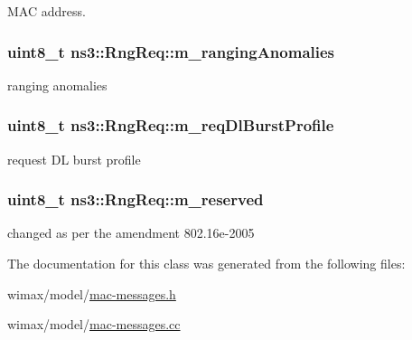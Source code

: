 M\+AC address. 

\subsubsection[{\texorpdfstring{m\+\_\+ranging\+Anomalies}{m_rangingAnomalies}}]{\setlength{\rightskip}{0pt plus 5cm}uint8\+\_\+t ns3\+::\+Rng\+Req\+::m\+\_\+ranging\+Anomalies\hspace{0.3cm}{\ttfamily [private]}}\hypertarget{classns3_1_1RngReq_a08c2d45b0e438f7865807e046087e082}{}\label{classns3_1_1RngReq_a08c2d45b0e438f7865807e046087e082}


ranging anomalies 

\subsubsection[{\texorpdfstring{m\+\_\+req\+Dl\+Burst\+Profile}{m_reqDlBurstProfile}}]{\setlength{\rightskip}{0pt plus 5cm}uint8\+\_\+t ns3\+::\+Rng\+Req\+::m\+\_\+req\+Dl\+Burst\+Profile\hspace{0.3cm}{\ttfamily [private]}}\hypertarget{classns3_1_1RngReq_abe2a3f531586c0df7b1f265ad87d96f5}{}\label{classns3_1_1RngReq_abe2a3f531586c0df7b1f265ad87d96f5}


request DL burst profile 

\subsubsection[{\texorpdfstring{m\+\_\+reserved}{m_reserved}}]{\setlength{\rightskip}{0pt plus 5cm}uint8\+\_\+t ns3\+::\+Rng\+Req\+::m\+\_\+reserved\hspace{0.3cm}{\ttfamily [private]}}\hypertarget{classns3_1_1RngReq_a7c560a2f40ebadea1b47737325d02bf6}{}\label{classns3_1_1RngReq_a7c560a2f40ebadea1b47737325d02bf6}


changed as per the amendment 802.\+16e-\/2005 



The documentation for this class was generated from the following files\+:\begin{DoxyCompactItemize}
\item 
wimax/model/\hyperlink{mac-messages_8h}{mac-\/messages.\+h}\item 
wimax/model/\hyperlink{mac-messages_8cc}{mac-\/messages.\+cc}\end{DoxyCompactItemize}

